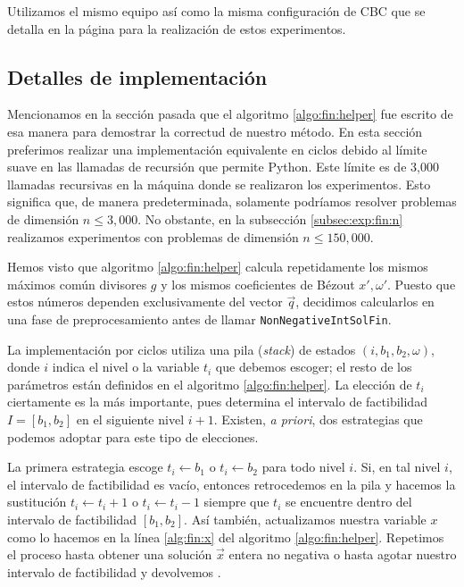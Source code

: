Utilizamos el mismo equipo así como la misma configuración de CBC que se detalla en la página
\pageref{subsec:inf:res} para la realización de estos experimentos.

\subsection{Detalles de implementación}
\label{subsec:fin:details}
\noindent
Mencionamos en la sección pasada que el algoritmo \ref{algo:fin:helper} fue escrito de esa manera para demostrar la
correctud de nuestro método. En esta sección preferimos realizar una implementación equivalente en ciclos
debido al límite suave en las llamadas de recursión que permite Python. Este límite es de 3{,}000
llamadas recursivas en la máquina donde se realizaron los experimentos. Esto significa que, de
manera predeterminada, solamente podríamos resolver problemas de dimensión $n \leq 3{,}000$. No
obstante, en la subsección \ref{subsec:exp:fin:n} realizamos experimentos con problemas de dimensión
$n \leq 150{,}000$.

Hemos visto que algoritmo \ref{algo:fin:helper} calcula repetidamente los mismos máximos común
divisores $g$ y los mismos coeficientes de Bézout $x', \omega'$. Puesto que estos números dependen
exclusivamente del vector $\vec{q}$, decidimos calcularlos en una fase de preprocesamiento antes de
llamar \texttt{NonNegativeIntSolFin}.

La implementación por ciclos utiliza una pila (\textit{stack}) de estados $(i, b_1, b_2, \omega)$,
donde $i$ indica el nivel o la variable $t_i$ que debemos escoger; el resto de los parámetros están
definidos en el algoritmo \ref{algo:fin:helper}. La elección de $t_i$ ciertamente es la más
importante, pues determina el intervalo de factibilidad $I = [b_1, b_2]$ en el siguiente nivel $i +
1$. Existen, \textit{a priori}, dos estrategias que podemos adoptar para este tipo de elecciones.

La primera estrategia escoge $t_i \leftarrow b_1$ o $t_i \leftarrow b_2$ para todo nivel $i$. Si, en
tal nivel $i$, el intervalo de factibilidad es vacío, entonces retrocedemos en la pila y hacemos la
sustitución $t_i \leftarrow t_i + 1$ o $t_i \leftarrow t_i - 1$ siempre que $t_i$ se encuentre
dentro del intervalo de factibilidad $[b_1, b_2]$. Así también, actualizamos nuestra variable $x$
como lo hacemos en la línea \ref{alg:fin:x} del algoritmo \ref{algo:fin:helper}. Repetimos el
proceso hasta obtener una solución $\vec{x}$ entera no negativa o hasta agotar nuestro intervalo de
factibilidad y devolvemos \NIL.

